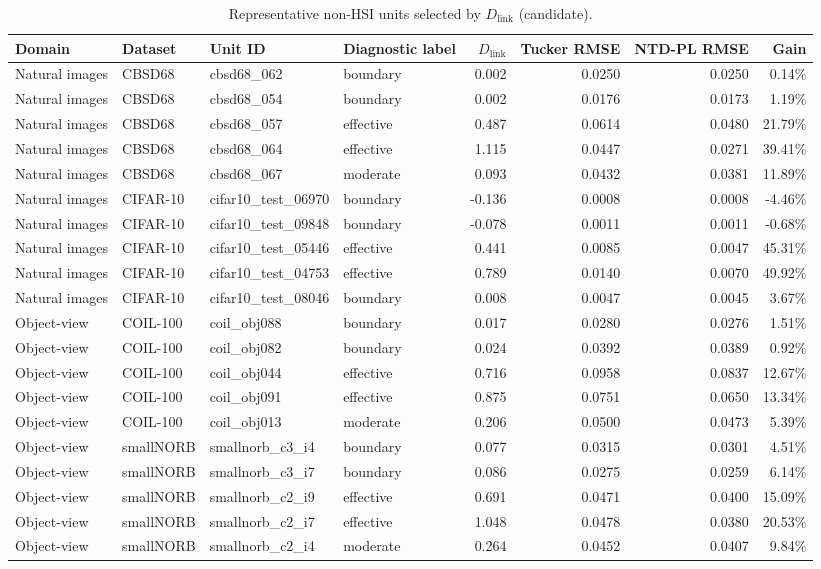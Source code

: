 \begin{table}[t]
\centering
\caption{Representative non-HSI units selected by $D_{\mathrm{link}}$ (candidate).}
\begin{tabular}{@{}l l l l r r r r@{}}
\toprule
Domain & Dataset & Unit ID & Diagnostic label & $D_{\mathrm{link}}$ & Tucker RMSE & NTD-PL RMSE & Gain \\
\midrule
Natural images & CBSD68 & cbsd68_062 & boundary & 0.002 & 0.0250 & 0.0250 & 0.14\% \\
Natural images & CBSD68 & cbsd68_054 & boundary & 0.002 & 0.0176 & 0.0173 & 1.19\% \\
Natural images & CBSD68 & cbsd68_057 & effective & 0.487 & 0.0614 & 0.0480 & 21.79\% \\
Natural images & CBSD68 & cbsd68_064 & effective & 1.115 & 0.0447 & 0.0271 & 39.41\% \\
Natural images & CBSD68 & cbsd68_067 & moderate & 0.093 & 0.0432 & 0.0381 & 11.89\% \\
Natural images & CIFAR-10 & cifar10_test_06970 & boundary & -0.136 & 0.0008 & 0.0008 & -4.46\% \\
Natural images & CIFAR-10 & cifar10_test_09848 & boundary & -0.078 & 0.0011 & 0.0011 & -0.68\% \\
Natural images & CIFAR-10 & cifar10_test_05446 & effective & 0.441 & 0.0085 & 0.0047 & 45.31\% \\
Natural images & CIFAR-10 & cifar10_test_04753 & effective & 0.789 & 0.0140 & 0.0070 & 49.92\% \\
Natural images & CIFAR-10 & cifar10_test_08046 & boundary & 0.008 & 0.0047 & 0.0045 & 3.67\% \\
Object-view & COIL-100 & coil_obj088 & boundary & 0.017 & 0.0280 & 0.0276 & 1.51\% \\
Object-view & COIL-100 & coil_obj082 & boundary & 0.024 & 0.0392 & 0.0389 & 0.92\% \\
Object-view & COIL-100 & coil_obj044 & effective & 0.716 & 0.0958 & 0.0837 & 12.67\% \\
Object-view & COIL-100 & coil_obj091 & effective & 0.875 & 0.0751 & 0.0650 & 13.34\% \\
Object-view & COIL-100 & coil_obj013 & moderate & 0.206 & 0.0500 & 0.0473 & 5.39\% \\
Object-view & smallNORB & smallnorb_c3_i4 & boundary & 0.077 & 0.0315 & 0.0301 & 4.51\% \\
Object-view & smallNORB & smallnorb_c3_i7 & boundary & 0.086 & 0.0275 & 0.0259 & 6.14\% \\
Object-view & smallNORB & smallnorb_c2_i9 & effective & 0.691 & 0.0471 & 0.0400 & 15.09\% \\
Object-view & smallNORB & smallnorb_c2_i7 & effective & 1.048 & 0.0478 & 0.0380 & 20.53\% \\
Object-view & smallNORB & smallnorb_c2_i4 & moderate & 0.264 & 0.0452 & 0.0407 & 9.84\% \\
\bottomrule
\end{tabular}
\end{table}
